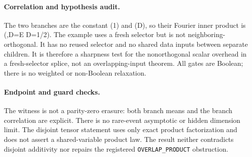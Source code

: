 \paragraph{Correlation and hypothesis audit.}
The two branches are the constant (1) and (D), so their Fourier inner
product is (,D\rangle=\mathbb E D=1/2).  The example uses a fresh
selector but is not neighboring-orthogonal.  It has no reused selector and no
shared data inputs between separate children.  It is therefore a sharpness
test for the nonorthogonal scalar overhead in a fresh-selector splice, not an
overlapping-input theorem.  All gates are Boolean; there is no weighted or
non-Boolean relaxation.

\paragraph{Endpoint and guard checks.}
The witness is not a parity-zero erasure: both branch means and the branch
correlation are explicit.  There is no rare-event asymptotic or hidden
dimension limit.  The disjoint tensor statement uses only exact product
factorization and does not assert a shared-variable product law.  The result
neither contradicts disjoint additivity nor repairs the registered
\texttt{OVERLAP\_PRODUCT} obstruction.

